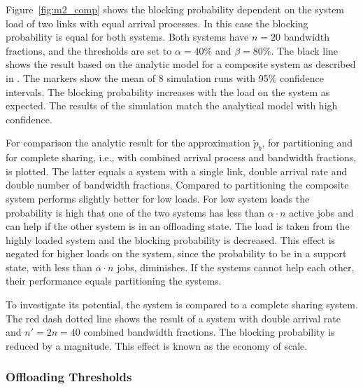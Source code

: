 Figure~\ref{fig:m2_comp} shows the blocking probability dependent on the system load of two links with equal arrival processes.
In this case the blocking probability is equal for both systems. Both systems have $n=20$ bandwidth fractions, and the thresholds are set to $\alpha=40\%$ and $\beta=80\%$.
The black line shows the result based on the analytic model for a composite system as described in .
The markers show the mean of 8 simulation runs with 95\% confidence intervals.
The blocking probability increases with the load on the system as expected.
The results of the simulation match the analytical model with high confidence.

For comparison the analytic result for the approximation $\tilde{p}_b$, for partitioning and for complete sharing, i.e., with combined arrival process and bandwidth fractions, is plotted.
The latter equals a system with a single link, double arrival rate and double number of bandwidth fractions.
Compared to partitioning the composite system performs slightly better for low loads.
For low system loads the probability is high that one of the two systems has less than $\alpha\cdot n$ active jobs and can help if the other system is in an offloading state.
The load is taken from the highly loaded system and the blocking probability is decreased.
This effect is negated for higher loads on the system, since the probability to be in a support state, with less than $\alpha\cdot n$ jobs, diminishes.
If the systems cannot help each other, their performance equals partitioning the systems.

To investigate its potential, the system is compared to a complete sharing system.
The red dash dotted line shows the result of a system with double arrival rate and $n'=2 n=40$ combined bandwidth fractions. The blocking probability is reduced by a magnitude. This effect is known as the economy of scale.


\subsubsection*{Offloading Thresholds}

